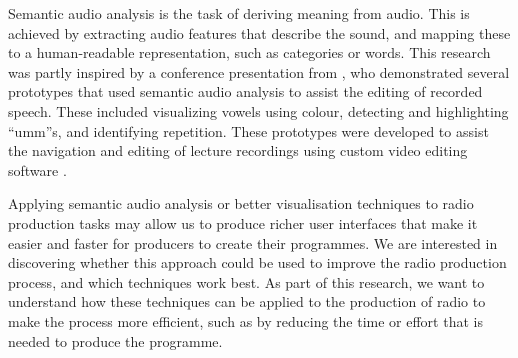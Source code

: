 Semantic audio analysis is the task of deriving meaning from audio. This is achieved by extracting audio features that
describe the sound, and mapping these to a human-readable representation, such as categories or words.
This research was partly inspired by a conference presentation from \citet{Loviscach2013}, who demonstrated several
prototypes that used semantic audio analysis to assist the editing of recorded speech. These included visualizing
vowels using colour, detecting and highlighting ``umm''s, and identifying repetition. These prototypes were developed
to assist the navigation and editing of lecture recordings using custom video editing software \citep{Loviscach2011a}.

Applying semantic audio analysis or better visualisation techniques to radio production tasks may allow us to produce
richer user interfaces that make it easier and faster for producers to create their programmes.  We are interested in
discovering whether this approach could be used to improve the radio production process, and which techniques work
best.  As part of this research, we want to understand how these techniques can be applied to the
production of radio to make the process more efficient, such as by reducing the time or effort that is needed to
produce the programme. 



